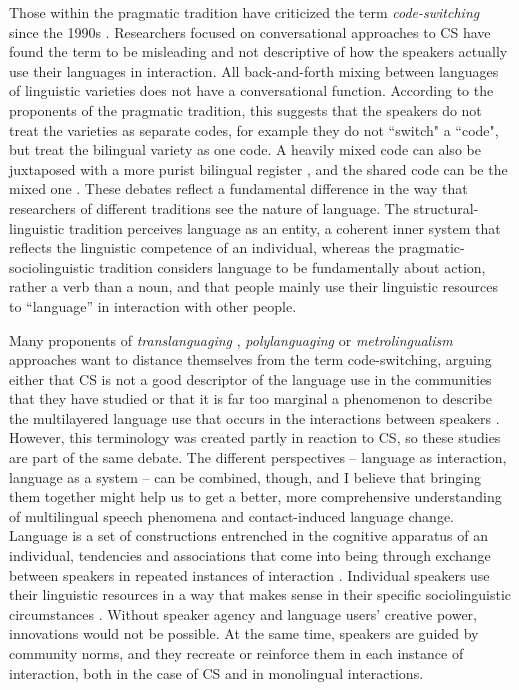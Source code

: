 \documentclass[output=paper]{langscibook}
\begin{document}
\begin{sloppypar}
Those within the pragmatic tradition have criticized the term \textit{code-switching} since the 1990s \parencite{auer1998code}. Researchers focused on conversational approaches to CS have found the term to be misleading and not descriptive of how the speakers actually use their languages in interaction. All back-and-forth mixing between languages of linguistic varieties does not have a conversational function. According to the proponents of the pragmatic tradition, this suggests that the speakers do not treat the varieties as separate codes, for example they do not “switch" a “code", but treat the bilingual variety as one code. A heavily mixed code can also be juxtaposed with a more purist bilingual register \parencite{meeuwis1998monolectal}, and the shared code can be the mixed one \parencite{alvarez1998codeswitching}. These debates reflect a fundamental difference in the way that researchers of different traditions see the nature of language. The structural-linguistic tradition perceives language as an entity, a coherent inner system that reflects the linguistic competence of an individual, whereas the pragmatic-sociolinguistic tradition considers language to be fundamentally about action, rather a verb than a noun, and that people mainly use their linguistic resources to ``language'' in interaction with other people.
\end{sloppypar}

Many proponents of \textit{translanguaging} \parencite{garcia2009education,creese2010translanguaging, garcia2014translanguaging}, \textit{polylanguaging} \parencite{jorgensen2011polylanguaging} or \textit{metrolingualism} \parencite{otsuji2010metrolingualism} approaches want to distance themselves from the term code-switching, arguing either that CS is not a good descriptor of the language use in the communities that they have studied \parencite{jorgensen2011polylanguaging} or that it is far too marginal a phenomenon to describe the multilayered language use that occurs in the interactions between speakers \parencite{garcia2014translanguaging}. However, this terminology was created partly in reaction to CS, so these studies are part of the same debate. The different perspectives – language as interaction, language as a system – can be combined, though, and I believe that bringing them together might help us to get a better, more comprehensive understanding of multilingual speech phenomena and contact-induced language change. Language is a set of constructions entrenched in the cognitive apparatus of an individual, tendencies and associations that come into being through exchange between speakers in repeated instances of interaction \parencite{beckner2009language, backus2013usage}. Individual speakers use their linguistic resources in a way that makes sense in their specific sociolinguistic circumstances \parencite{heller2007bilingualism}. Without speaker agency and language users’ creative power, innovations would not be possible. At the same time, speakers are guided by community norms, and they recreate or reinforce them in each instance of interaction, both in the case of CS and in monolingual interactions.
\end{document}
